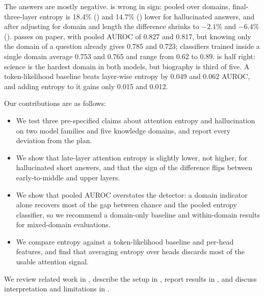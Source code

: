 The answers are mostly negative.
\Hone is wrong in sign: pooled over domains, final-three-layer entropy is 18.4\% (\qwen) and 14.7\% (\llama) lower for hallucinated answers, and after adjusting for domain and length the difference shrinks to $-2.1\%$ and $-6.4\%$ ().
\Htwo passes on paper, with pooled AUROC of 0.827 and 0.817, but knowing only the domain of a question already gives 0.785 and 0.723; classifiers trained inside a single domain average 0.753 and 0.765 and range from 0.62 to 0.89.
\Hthree is half right: science is the hardest domain in both models, but biography is third of five.
A token-likelihood baseline beats layer-wise entropy by 0.049 and 0.062 AUROC, and adding entropy to it gains only 0.015 and 0.012.

Our contributions are as follows:
\begin{itemize}[leftmargin=*,itemsep=0pt,topsep=0pt]
    \item We test three pre-specified claims about attention entropy and hallucination on two model families and five knowledge domains, and report every deviation from the plan.
    \item We show that late-layer attention entropy is slightly lower, not higher, for hallucinated short answers, and that the sign of the difference flips between early-to-middle and upper layers.
    \item We show that pooled AUROC overstates the detector: a domain indicator alone recovers most of the gap between chance and the pooled entropy classifier, so we recommend a domain-only baseline and within-domain results for mixed-domain evaluations.
    \item We compare entropy against a token-likelihood baseline and per-head features, and find that averaging entropy over heads discards most of the usable attention signal.
\end{itemize}

We review related work in , describe the setup in , report results in , and discuss interpretation and limitations in .

